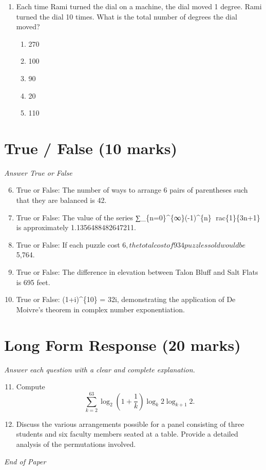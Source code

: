 \documentclass[12pt]{article}
\begin{document}
\begin{enumerate}[label=\arabic*.]
\begin{enumerate}[label=(\alph*)]
    \item 0.959
\end{enumerate}
\item Each time Rami turned the dial on a machine, the dial moved 1 degree. Rami turned the dial
10 times. What is the total number of degrees the dial moved?
\begin{enumerate}[label=(\alph*)]
    \item 270
    \item 100
    \item 90
    \item 20
    \item 110
\end{enumerate}
\end{enumerate}

\section*{True / False (10 marks)}
\textit{Answer True or False}
\begin{enumerate}[label=\arabic*.]
\setcounter{enumi}{5}
\item True or False: The number of ways to arrange 6 pairs of parentheses such that they are balanced is 42.
\item True or False: The value of the series ∑\_\{n=0\}\^{}\{∞\}(-1)\^{}\{n\} rac\{1\}\{3n+1\} is approximately 1.1356488482647211.
\item True or False: If each puzzle cost $6, the total cost of 934 puzzles sold would be $5,764.
\item True or False: The difference in elevation between Talon Bluff and Salt Flats is 695 feet.
\item True or False: (1+i)\^{}\{10\} = 32i, demonstrating the application of De Moivre's theorem in complex number exponentiation.
\end{enumerate}

\section*{Long Form Response (20 marks)}
\textit{Answer each question with a clear and complete explanation.}
\begin{enumerate}[label=\arabic*.]
\setcounter{enumi}{10}
\item Compute \[\sum_{k=2}^{63} \log_2\left(1 + \frac{1}{k}\right) \log_k 2 \log_{k+1} 2.\]
\item Discuss the various arrangements possible for a panel consisting of three students and six
faculty members seated at a table. Provide a detailed analysis of the permutations
involved.
\end{enumerate}

\vfill
\noindent\textit{End of Paper}
\end{document}
